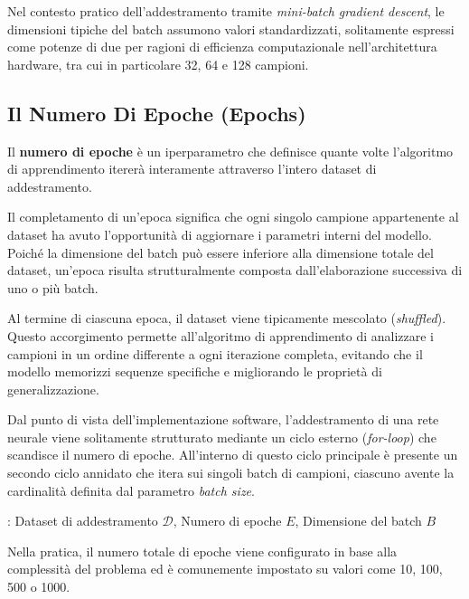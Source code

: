 ﻿\documentclass[11pt, a4paper]{article}
\begin{document}
Nel contesto pratico dell'addestramento tramite \emph{mini-batch gradient descent}, le dimensioni tipiche del batch assumono valori standardizzati, solitamente espressi come potenze di due per ragioni di efficienza computazionale nell'architettura hardware, tra cui in particolare \num{32}, \num{64} e \num{128} campioni.

\newpage

\subsection{Il Numero Di Epoche (Epochs)}

Il \textbf{numero di epoche} è un iperparametro che definisce quante volte l'algoritmo di apprendimento itererà interamente attraverso l'intero dataset di addestramento.

Il completamento di un'epoca significa che ogni singolo campione appartenente al dataset ha avuto l'opportunità di aggiornare i parametri interni del modello. Poiché la dimensione del batch può essere inferiore alla dimensione totale del dataset, un'epoca risulta strutturalmente composta dall'elaborazione successiva di uno o più batch.

Al termine di ciascuna epoca, il dataset viene tipicamente mescolato (\emph{shuffled}). Questo accorgimento permette all'algoritmo di apprendimento di analizzare i campioni in un ordine differente a ogni iterazione completa, evitando che il modello memorizzi sequenze specifiche e migliorando le proprietà di generalizzazione.

Dal punto di vista dell'implementazione software, l'addestramento di una rete neurale viene solitamente strutturato mediante un ciclo esterno (\emph{for-loop}) che scandisce il numero di epoche. All'interno di questo ciclo principale è presente un secondo ciclo annidato che itera sui singoli batch di campioni, ciascuno avente la cardinalità definita dal parametro \emph{batch size}.

\begin{algorithm}[H]
\caption{Algoritmo di Iterazione per l'Addestramento di una Rete Neurale}
\Dati: Dataset di addestramento $\mathcal{D}$, Numero di epoche $E$, Dimensione del batch $B$\;
\;
\end{algorithm}

Nella pratica, il numero totale di epoche viene configurato in base alla complessità del problema ed è comunemente impostato su valori come \num{10}, \num{100}, \num{500} o \num{1000}.
\end{document}
